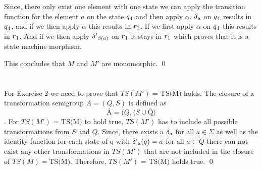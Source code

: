 \documentclass[a4paper,12pt,numbers=noenddot]{scrreport}
\begin{document}
Since, there only exist one element with one state we can apply the transition function for the element $a$ on the state $q\textsubscript{4}$ and then apply $\alpha$. $\delta\textsubscript{a}$ on $q\textsubscript{4}$ results in $q\textsubscript{4}$, and if we then apply $\alpha$ this results in $r\textsubscript{1}$. If we first apply $\alpha$ on $q\textsubscript{4}$ this results in $r\textsubscript{1}$. And if we then apply $\delta'\textsubscript{$\beta(a)$}$ on $r\textsubscript{1}$ it stays in $r\textsubscript{1}$ which proves that it is a state machine morphism. 

This concludes that $M$ and $M'$ are monomorphic.
\qed

\section{}

For Exercise 2 we need to prove that $TS(M')$ = $\overline{\mbox{TS(M)}}$ holds. The closure of a transformation semigroup $A = (Q, S)$ is defined as 
\begin{equation}
    \overline{\mbox{A}} = (Q, \langle S \cup \overline{\mbox{Q}} \rangle
\end{equation}
.
For $TS(M')$ = $\overline{\mbox{TS(M)}}$ to hold true, $TS(M')$ has to include all possible transformations from $S$ and $Q$. Since, there exists a $\delta\textsubscript{a}$ for all $a \in \Sigma$ as well as the identity function for each state of q with $\delta'\textsubscript{a}(q) = a$ for all $a \in Q$ there can not exist any other transformations in $TS(M')$ that are not included in the closure of $TS(M) = \overline{\mbox{TS(M)}}$. Therefore, $TS(M')$ = $\overline{\mbox{TS(M)}}$ holds true.
\qed
\end{document}
